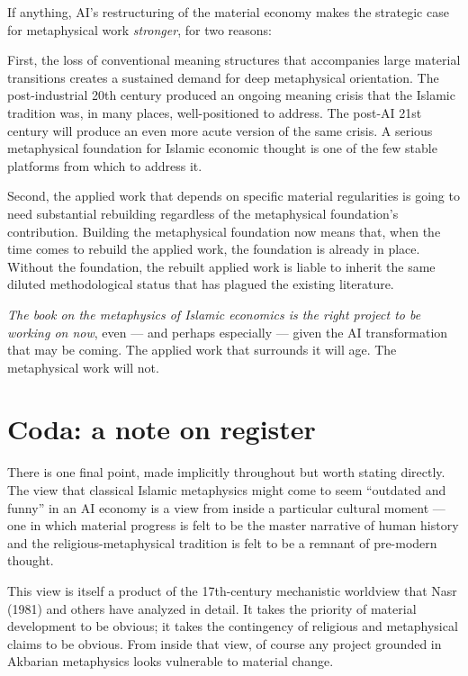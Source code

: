\documentclass[11pt,a4paper]{article}
\begin{document}
If anything, AI's restructuring of the material economy makes the
strategic case for metaphysical work \textit{stronger}, for two
reasons:

First, the loss of conventional meaning structures that
accompanies large material transitions creates a sustained demand
for deep metaphysical orientation. The post-industrial 20th
century produced an ongoing meaning crisis that the Islamic
tradition was, in many places, well-positioned to address. The
post-AI 21st century will produce an even more acute version of
the same crisis. A serious metaphysical foundation for Islamic
economic thought is one of the few stable platforms from which to
address it.

Second, the applied work that depends on specific material
regularities is going to need substantial rebuilding regardless of
the metaphysical foundation's contribution. Building the
metaphysical foundation now means that, when the time comes to
rebuild the applied work, the foundation is already in place.
Without the foundation, the rebuilt applied work is liable to
inherit the same diluted methodological status that has plagued
the existing literature.

\textit{The book on the metaphysics of Islamic economics is the
right project to be working on now}, even --- and perhaps
especially --- given the AI transformation that may be coming.
The applied work that surrounds it will age. The metaphysical
work will not.

\section{Coda: a note on register}
\label{sec:coda}

There is one final point, made implicitly throughout but worth
stating directly. The view that classical Islamic metaphysics
might come to seem ``outdated and funny'' in an AI economy is a
view from inside a particular cultural moment --- one in which
material progress is felt to be the master narrative of human
history and the religious-metaphysical tradition is felt to be a
remnant of pre-modern thought.

This view is itself a product of the 17th-century mechanistic
worldview that Nasr (1981) and others have analyzed in detail. It
takes the priority of material development to be obvious; it
takes the contingency of religious and metaphysical claims to be
obvious. From inside that view, of course any project grounded in
Akbarian metaphysics looks vulnerable to material change.
\end{document}
